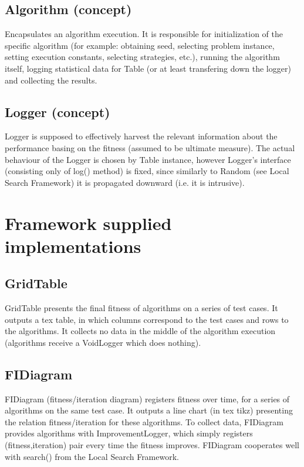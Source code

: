 \subsection{Algorithm (concept)}

Encapsulates an algorithm execution. It is responsible for
initialization of the specific algorithm (for example: obtaining seed, 
selecting problem instance, setting execution constants, selecting strategies,
etc.), running the algorithm itself, logging statistical data for Table
(or at least transfering down the logger) and collecting the results.

\subsection{Logger (concept)}

Logger is supposed to effectively harvest the relevant information
about the performance basing on the fitness (assumed to be ultimate measure).
The actual behaviour of the Logger is chosen by Table instance, however
Logger's interface (consisting only of log() method) is fixed,
since similarly to Random (see Local Search Framework) it is propagated downward
(i.e. it is intrusive).

\section{Framework supplied implementations}

\subsection{GridTable}

GridTable presents the final fitness of algorithms on a series of test cases.
It outputs a tex table, in which columns correspond to the test cases and
rows to the algorithms. It collects no data in the middle of the algorithm
execution (algorithms receive a VoidLogger which does nothing).

\subsection{FIDiagram}

FIDiagram (fitness/iteration diagram) registers fitness over time,
for a series of algorithms on the same test case.
It outputs a line chart (in tex tikz) presenting the relation fitness/iteration
for these algorithms. To collect data, FIDiagram provides algorithms with
ImprovementLogger, which simply registers (fitness,iteration) pair every time the fitness
improves. FIDiagram cooperates well with search() from the Local Search Framework.

